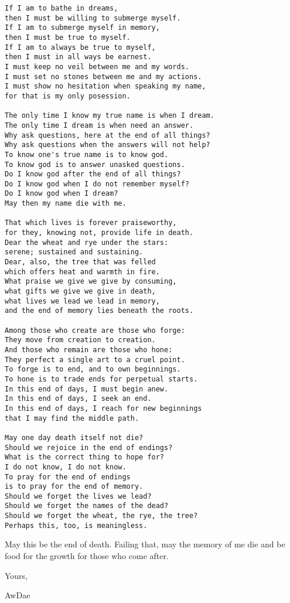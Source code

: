 \begin{verbatim}
If I am to bathe in dreams,
then I must be willing to submerge myself.
If I am to submerge myself in memory,
then I must be true to myself.
If I am to always be true to myself,
then I must in all ways be earnest.
I must keep no veil between me and my words.
I must set no stones between me and my actions.
I must show no hesitation when speaking my name,
for that is my only posession.

The only time I know my true name is when I dream.
The only time I dream is when need an answer.
Why ask questions, here at the end of all things?
Why ask questions when the answers will not help?
To know one's true name is to know god.
To know god is to answer unasked questions.
Do I know god after the end of all things?
Do I know god when I do not remember myself?
Do I know god when I dream?
May then my name die with me.

That which lives is forever praiseworthy,
for they, knowing not, provide life in death.
Dear the wheat and rye under the stars:
serene; sustained and sustaining.
Dear, also, the tree that was felled
which offers heat and warmth in fire.
What praise we give we give by consuming,
what gifts we give we give in death,
what lives we lead we lead in memory,
and the end of memory lies beneath the roots.

Among those who create are those who forge:
They move from creation to creation.
And those who remain are those who hone:
They perfect a single art to a cruel point.
To forge is to end, and to own beginnings.
To hone is to trade ends for perpetual starts.
In this end of days, I must begin anew.
In this end of days, I seek an end.
In this end of days, I reach for new beginnings
that I may find the middle path.

May one day death itself not die?
Should we rejoice in the end of endings?
What is the correct thing to hope for?
I do not know, I do not know.
To pray for the end of endings
is to pray for the end of memory.
Should we forget the lives we lead?
Should we forget the names of the dead?
Should we forget the wheat, the rye, the tree?
Perhaps this, too, is meaningless.
\end{verbatim}

May this be the end of death. Failing that, may the memory of me die and be food for the growth for those who come after.

Yours,

AwDae
